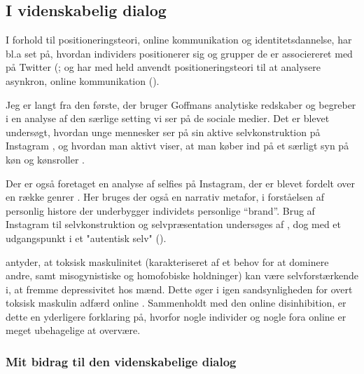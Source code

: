 \subsection{I videnskabelig dialog}

I forhold til positioneringsteori, online kommunikation og 
identitetsdannelse, har bl.a 
\citeauthor{lopezlongTweetingChoirReligious2012} set på, hvordan 
individers positionerer sig og grupper de er associereret med på 
Twitter (\citeyear{lopezlongTweetingChoirReligious2012}; og 
\citeauthor{dennenFacilitatorPresenceIdentity2011} har med held 
anvendt positioneringsteori til at analysere asynkron, online 
kommunikation (\citeyear{dennenFacilitatorPresenceIdentity2011}).

Jeg er langt fra den første, der bruger Goffmans analytiske 
redskaber og begreber i en analyse af den særlige setting vi ser 
på de sociale medier. Det er blevet undersøgt, hvordan unge 
mennesker ser på sin aktive selvkonstruktion på Instagram 
\autocite{seehaferNOFILTERExplorationInstagram2017a}, og hvordan 
man aktivt viser, at man køber ind på et særligt syn på køn og 
kønsroller \autocite{bakerGoodMorningFitfam2018}.

Der er også foretaget en analyse af selfies på Instagram, der er 
blevet fordelt over en række genrer 
\autocite{eagarClassifyingNarratedSelfie2016}. Her bruges der også 
en narrativ metafor, i forståelsen af personlig histore der 
underbygger individets personlige “brand”. Brug
af Instagram til selvkonstruktion og selvpræsentation undersøges 
af \citeauthor{lazebnaRoleCommunicationApprehension2015}, dog med 
et udgangspunkt i et "autentisk selv" 
(\citeyear{lazebnaRoleCommunicationApprehension2015}).

\citeauthor{parentSocialMediaBehavior2018} antyder, at toksisk 
maskulinitet (karakteriseret af et behov for at dominere andre, 
samt misogynistiske og homofobiske holdninger) kan være 
selvforstærkende i, at fremme depressivitet hos mænd. Dette øger i 
igen sandsynligheden for overt toksisk maskulin adfærd online 
\autocite{parentSocialMediaBehavior2018}. Sammenholdt med den 
online disinhibition, er dette en yderligere forklaring på, 
hvorfor nogle individer og nogle fora online er meget ubehagelige 
at overvære.

\subsubsection{Mit bidrag til den videnskabelige dialog}

